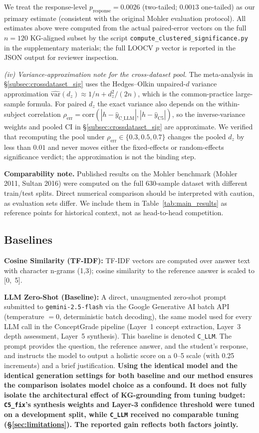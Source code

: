 \documentclass[conference]{IEEEtran}
\begin{document}
We treat the response-level $p_{\text{response}} = 0.0026$ (two-tailed; $0.0013$
one-tailed) as our primary estimate (consistent with the original Mohler
evaluation protocol). All estimates above were computed from the actual
paired-error vectors on the full $n=120$ KG-aligned subset by the script
\texttt{compute\_clustered\_significance.py} in the supplementary materials;
the full LOOCV $p$ vector is reported in the JSON output for reviewer
inspection.

\emph{(iv) Variance-approximation note for the cross-dataset pool.} The
meta-analysis in \S\ref{subsec:crossdataset_sig} uses the Hedges--Olkin
unpaired-$d$ variance approximation
$\widehat{\text{var}}(d_z) \approx 1/n + d_z^2/(2n)$, which is the
common-practice large-sample formula. For paired $d_z$ the exact variance
also depends on the within-subject correlation
$\rho_{\text{err}} = \text{corr}(|h - \hat{y}_{\text{C\_LLM}}|, |h -
\hat{y}_{\text{C5}}|)$, so the inverse-variance weights and pooled CI in
\S\ref{subsec:crossdataset_sig} are approximate. We verified that
recomputing the pool under $\rho_{\text{err}} \in \{0.3, 0.5, 0.7\}$
changes the pooled $d_z$ by less than $0.01$ and never moves either the
fixed-effects or random-effects significance verdict; the approximation is
not the binding step.

\textbf{Comparability note.} Published results on the Mohler benchmark (Mohler 2011,
Sultan 2016) were computed on the full 630-sample dataset with different
train/test splits. Direct numerical comparison should be interpreted with caution,
as evaluation sets differ. We include them in Table~\ref{tab:main_results} as
reference points for historical context, not as head-to-head competition.

\subsection{Baselines}

\textbf{Cosine Similarity (TF-IDF):} TF-IDF vectors are computed over answer text
with character n-grams (1,3); cosine similarity to the reference answer is scaled
to [0,~5].

\textbf{LLM Zero-Shot (Baseline):} A direct, unaugmented zero-shot prompt submitted to \texttt{gemini-2.5-flash} \cite{geminiteam2025} via the Google Generative AI batch API (temperature $= 0$, deterministic batch decoding), the same model used for every LLM call in the ConceptGrade pipeline (Layer~1 concept extraction, Layer~3 depth assessment, Layer~5 synthesis). This baseline is denoted \texttt{C\_LLM}. The prompt provides the question, the reference answer, and the student's response, and instructs the model to output a holistic score on a 0--5 scale (with 0.25 increments) and a brief justification. \textbf{Using the identical model and the identical generation settings for both baseline and our method ensures the comparison isolates model choice as a confound. It does not fully isolate the architectural effect of KG-grounding from tuning budget: \texttt{C5\_fix}'s synthesis weights and Layer-3 confidence threshold were tuned on a development split, while \texttt{C\_LLM} received no comparable tuning (\S\ref{sec:limitations}). The reported gain reflects both factors jointly.}
\end{document}
